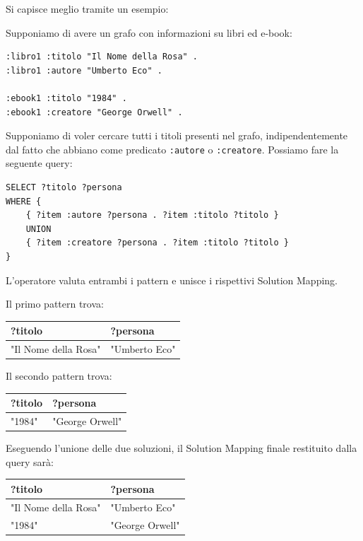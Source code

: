 Si capisce meglio tramite un esempio:

Supponiamo di avere un grafo con informazioni su libri ed e-book:

\begin{verbatim}
:libro1 :titolo "Il Nome della Rosa" .
:libro1 :autore "Umberto Eco" .

:ebook1 :titolo "1984" .
:ebook1 :creatore "George Orwell" .
\end{verbatim}

Supponiamo di voler cercare tutti i titoli presenti nel grafo, indipendentemente dal fatto che abbiano come predicato \texttt{:autore} o \texttt{:creatore}. Possiamo fare la seguente query:

\begin{verbatim}
SELECT ?titolo ?persona
WHERE {
    { ?item :autore ?persona . ?item :titolo ?titolo }
    UNION
    { ?item :creatore ?persona . ?item :titolo ?titolo }
}
\end{verbatim}

L'operatore valuta entrambi i pattern e unisce i rispettivi Solution Mapping.

Il primo pattern trova:
\begin{table}[h!]
\centering
\begin{tabular}{|l|l|}
\hline
\textbf{?titolo} & \textbf{?persona} \\ \hline
"Il Nome della Rosa" & "Umberto Eco" \\ \hline
\end{tabular}
\end{table}

Il secondo pattern trova:
\begin{table}[h!]
\centering
\begin{tabular}{|l|l|}
\hline
\textbf{?titolo} & \textbf{?persona} \\ \hline
"1984" & "George Orwell" \\ \hline
\end{tabular}
\end{table}

Eseguendo l'unione delle due soluzioni, il Solution Mapping finale restituito dalla query sarà:

\begin{table}[h!]
\centering
\begin{tabular}{|l|l|}
\hline
\textbf{?titolo} & \textbf{?persona} \\ \hline
"Il Nome della Rosa" & "Umberto Eco" \\ \hline
"1984" & "George Orwell" \\ \hline
\end{tabular}
\end{table}


